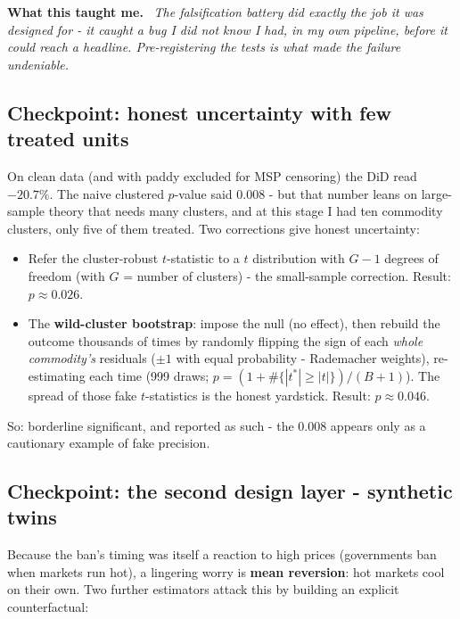 \documentclass[11pt]{article}
\newenvironment{lesson}
  {\begin{framed}\noindent\textbf{What this taught me.}\ \itshape}
  {\end{framed}}
\begin{document}
\begin{lesson}
The falsification battery did exactly the job it was designed for - it caught a bug I did
not know I had, in my own pipeline, before it could reach a headline. Pre-registering the
tests is what made the failure undeniable.
\end{lesson}

\subsection{Checkpoint: honest uncertainty with few treated units}

On clean data (and with paddy excluded for MSP censoring) the DiD read $\mathbf{-20.7\%}$.
The naive clustered $p$-value said 0.008 - but that number leans on large-sample theory
that needs many clusters, and at this stage I had ten commodity clusters, only five of
them treated.
Two corrections give honest uncertainty:

\begin{itemize}[leftmargin=1.8em,itemsep=1pt]
  \item Refer the cluster-robust $t$-statistic to a $t$ distribution with $G-1$ degrees of
        freedom (with $G$ = number of clusters) - the small-sample correction. Result:
        $p \approx 0.026$.
  \item The \textbf{wild-cluster bootstrap}: impose the null (no effect), then rebuild the
        outcome thousands of times by randomly flipping the sign of each \emph{whole
        commodity's} residuals ($\pm1$ with equal probability - Rademacher weights),
        re-estimating each time (999 draws; $p=(1+\#\{|t^*|\ge|t|\})/(B+1)$). The spread
        of those fake $t$-statistics is the honest yardstick. Result: $p \approx 0.046$.
\end{itemize}

So: borderline significant, and reported as such - the 0.008 appears only as a cautionary
example of fake precision.

\subsection{Checkpoint: the second design layer - synthetic twins}

Because the ban's timing was itself a reaction to high prices (governments ban when
markets run hot), a lingering worry is \textbf{mean reversion}: hot markets cool on their
own. Two further estimators attack this by building an explicit counterfactual:
\end{document}
